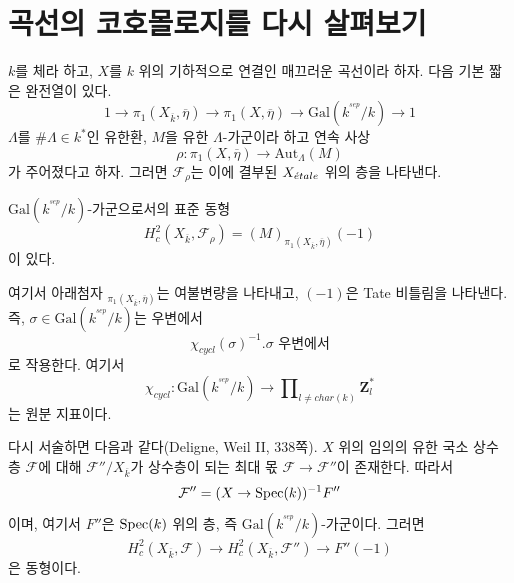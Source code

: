 \section{곡선의 코호몰로지를 다시 살펴보기}
\label{section-cohomology-curves-revisited}

\noindent
$k$를 체라 하고, $X$를 $k$ 위의 기하적으로 연결인 매끄러운 곡선이라 하자.
다음 기본 짧은 완전열이 있다.
$$
1 \to
\pi_1(X_{\overline{k}}, \overline \eta) \to
\pi_1(X, \overline\eta) \to
\text{Gal}(k^{^{sep}}/k) \to 1
$$
$\Lambda$를 $\#\Lambda\in k^*$인 유한환, $M$을 유한
$\Lambda$-가군이라 하고 연속 사상
$$
\rho : \pi_1(X, \overline\eta) \to \text{Aut}_{\Lambda}(M)
$$
가 주어졌다고 하자. 그러면 $\mathcal{F}_\rho$는 이에 결부된
$X_{\acute{e}tale}$ 위의 층을 나타낸다.

\begin{lemma}
\label{lemma-identify-h2c}
$\text{Gal}(k^{^{sep}}/k)$-가군으로서의 표준 동형
$$
H_c^2(X_{\overline{k}}, \mathcal{F}_\rho)=(M)_{\pi_1(X_{\overline{k}},
\overline\eta)}(-1)
$$
이 있다.
\end{lemma}

\noindent
여기서 아래첨자 ${}_{\pi_1(X_{\overline{k}}, \overline\eta)}$는
여불변량을 나타내고, $(-1)$은 Tate 비틀림을 나타낸다. 즉,
$\sigma\in \text{Gal}(k^{^{sep}}/k)$는 우변에서
$$
\chi_{cycl}(\sigma)^{-1}.\sigma\text{ 우변에서}
$$
로 작용한다. 여기서
$$
\chi_{cycl} :
\text{Gal}(k^{^{sep}}/k)
\to
\prod\nolimits_{l\neq char(k)}\mathbf{Z}_l^*
$$
는 원분 지표이다.

\medskip\noindent
다시 서술하면 다음과 같다(Deligne, Weil II, 338쪽). $X$ 위의 임의의
유한 국소 상수 층 $\mathcal{F}$에 대해 $\mathcal{F}''/X_{\overline{k}}$가
상수층이 되는 최대 몫 $\mathcal{F}\to \mathcal{F}''$이 존재한다. 따라서
$$
\mathcal{F}'' = (X\to \mathop{\mathrm{Spec}}(k))^{-1}F''
$$
이며, 여기서 $F''$은 $\mathop{\mathrm{Spec}}(k)$ 위의 층, 즉
$\text{Gal}(k^{^{sep}}/k)$-가군이다. 그러면
$$
H_c^2(X_{\overline{k}}, \mathcal{F})\to H_c^2(X_{\overline{k}},
\mathcal{F}'')\to F''(-1)
$$
은 동형이다.

